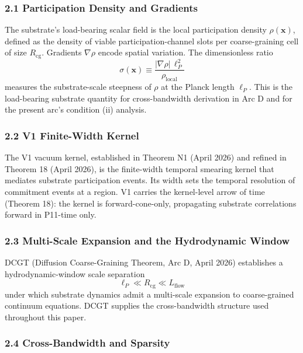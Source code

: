 \documentclass[
  11pt,
  a4paper,
]{article}
\begin{document}
\subsubsection{2.1 Participation Density and
Gradients}\label{participation-density-and-gradients}

The substrate's load-bearing scalar field is the local participation
density \(\rho(\mathbf{x})\), defined as the density of viable
participation-channel slots per coarse-graining cell of size
\(R_{\mathrm{cg}}\). Gradients \(\nabla\rho\) encode spatial variation.
The dimensionless ratio \[
\sigma(\mathbf{x}) \equiv \frac{|\nabla\rho|\,\ell_P^2}{\rho_{\mathrm{local}}}
\] measures the substrate-scale steepness of \(\rho\) at the Planck
length \(\ell_P\). This is the load-bearing substrate quantity for
cross-bandwidth derivation in Arc D and for the present arc's condition
(ii) analysis.

\subsubsection{2.2 V1 Finite-Width Kernel}\label{v1-finite-width-kernel}

The V1 vacuum kernel, established in Theorem N1 (April 2026) and refined
in Theorem 18 (April 2026), is the finite-width temporal smearing kernel
that mediates substrate participation events. Its width sets the
temporal resolution of commitment events at a region. V1 carries the
kernel-level arrow of time (Theorem 18): the kernel is
forward-cone-only, propagating substrate correlations forward in
P11-time only.

\subsubsection{2.3 Multi-Scale Expansion and the Hydrodynamic
Window}\label{multi-scale-expansion-and-the-hydrodynamic-window}

DCGT (Diffusion Coarse-Graining Theorem, Arc D, April 2026) establishes
a hydrodynamic-window scale separation \[
\ell_P \ll R_{\mathrm{cg}} \ll L_{\mathrm{flow}}
\] under which substrate dynamics admit a multi-scale expansion to
coarse-grained continuum equations. DCGT supplies the cross-bandwidth
structure used throughout this paper.

\subsubsection{2.4 Cross-Bandwidth and
Sparsity}\label{cross-bandwidth-and-sparsity}
\end{document}
